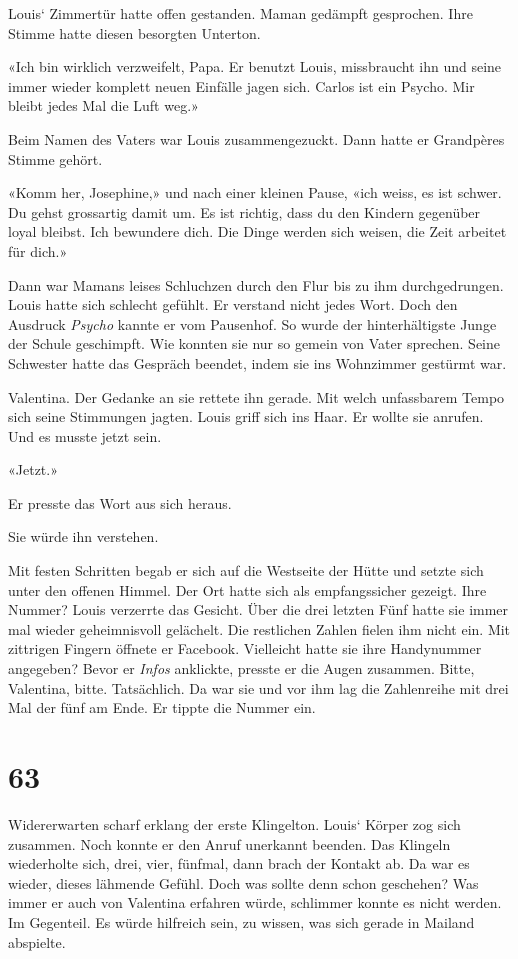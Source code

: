 Louis` Zimmertür hatte offen gestanden. Maman gedämpft gesprochen. Ihre
Stimme hatte diesen besorgten Unterton.

«Ich bin wirklich verzweifelt, Papa. Er benutzt Louis, missbraucht ihn
und seine immer wieder komplett neuen Einfälle jagen sich. Carlos ist
ein Psycho. Mir bleibt jedes Mal die Luft weg.»

Beim Namen des Vaters war Louis zusammengezuckt. Dann hatte er
Grandpères Stimme gehört.

«Komm her, Josephine,» und nach einer kleinen Pause, «ich weiss, es ist
schwer. Du gehst grossartig damit um. Es ist richtig, dass du den
Kindern gegenüber loyal bleibst. Ich bewundere dich. Die Dinge werden
sich weisen, die Zeit arbeitet für dich.»

Dann war Mamans leises Schluchzen durch den Flur bis zu ihm
durchgedrungen. Louis hatte sich schlecht gefühlt. Er verstand nicht
jedes Wort. Doch den Ausdruck \emph{Psycho} kannte er vom Pausenhof. So
wurde der hinterhältigste Junge der Schule geschimpft. Wie konnten sie
nur so gemein von Vater sprechen. Seine Schwester hatte das Gespräch
beendet, indem sie ins Wohnzimmer gestürmt war.

Valentina. Der Gedanke an sie rettete ihn gerade. Mit welch unfassbarem
Tempo sich seine Stimmungen jagten. Louis griff sich ins Haar. Er wollte
sie anrufen. Und es musste jetzt sein.

«Jetzt.»

Er presste das Wort aus sich heraus.

Sie würde ihn verstehen.

Mit festen Schritten begab er sich auf die Westseite der Hütte und
setzte sich unter den offenen Himmel. Der Ort hatte sich als
empfangssicher gezeigt. Ihre Nummer? Louis verzerrte das Gesicht. Über
die drei letzten Fünf hatte sie immer mal wieder geheimnisvoll
gelächelt. Die restlichen Zahlen fielen ihm nicht ein. Mit zittrigen
Fingern öffnete er Facebook. Vielleicht hatte sie ihre Handynummer
angegeben? Bevor er \emph{Infos} anklickte, presste er die Augen
zusammen. Bitte, Valentina, bitte. Tatsächlich. Da war sie und vor ihm
lag die Zahlenreihe mit drei Mal der fünf am Ende. Er tippte die Nummer
ein.

\chapter{63}\label{section-63}

Widererwarten scharf erklang der erste Klingelton. Louis` Körper zog
sich zusammen. Noch konnte er den Anruf unerkannt beenden. Das Klingeln
wiederholte sich, drei, vier, fünfmal, dann brach der Kontakt ab. Da war
es wieder, dieses lähmende Gefühl. Doch was sollte denn schon geschehen?
Was immer er auch von Valentina erfahren würde, schlimmer konnte es
nicht werden. Im Gegenteil. Es würde hilfreich sein, zu wissen, was sich
gerade in Mailand abspielte.


